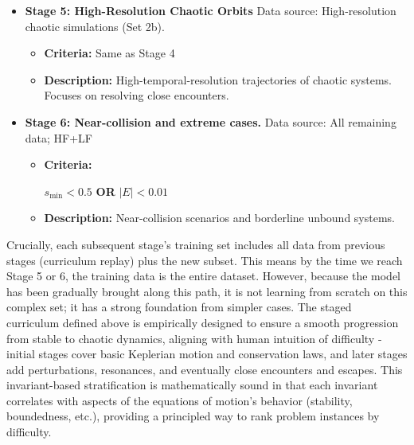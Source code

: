 \begin{itemize}
    \item \textbf{Stage 5: High-Resolution Chaotic Orbits}
    Data source: High-resolution chaotic simulations (Set 2b).
    
    \begin{itemize}
        \item \textbf{Criteria:} Same as Stage 4
        \item \textbf{Description:} High-temporal-resolution trajectories of chaotic systems. Focuses on resolving close encounters.
    \end{itemize}


    \item \textbf{Stage 6: Near-collision and extreme cases.} 
    Data source: All remaining data; HF+LF 
    
    \begin{itemize}  
        \item \textbf{Criteria:}
        
        $s_{\min} < 0.5$ \textbf{OR} $|E| < 0.01$
  
        \item \textbf{Description:} Near-collision scenarios and borderline unbound systems.
    \end{itemize}

\end{itemize}



Crucially, each subsequent stage's training set includes all data from previous stages (curriculum replay) plus the new subset.  
This means by the time we reach Stage 5 or 6, the training data is the entire dataset.  
However, because the model has been gradually brought along this path, it is not learning from scratch on this complex set;  
it has a strong foundation from simpler cases. The staged curriculum defined above is empirically designed to ensure a smooth 
progression from stable to chaotic dynamics, aligning with human intuition of difficulty - initial stages cover basic Keplerian 
motion and conservation laws, and later stages add perturbations, resonances, and eventually close encounters and escapes.  
This invariant-based stratification is mathematically sound in that each invariant correlates with aspects of the equations 
of motion's behavior (stability, boundedness, etc.), providing a principled way to rank problem instances by difficulty. 


